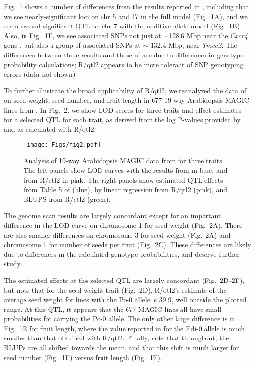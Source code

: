 \documentclass[12pt,letterpaper]{article}
\begin{document}
Fig.~1 shows a number of differences from the results reported in
\citet{gatti2014}, including that we see nearly-significant loci on
chr 5 and 17 in the full model (Fig.~1A), and we see a second
significant QTL on chr 7 with the additive allele model (Fig.~1B).
Also, in Fig.~1E,  we see associated
SNPs not just at $\sim$128.6 Mbp near the \emph{Cxcr4\/} gene
\citep[as in][]{gatti2014}, but also a
group of associated SNPs at $\sim$ 132.4 Mbp, near \emph{Tmcc2}. The
differences between these results and those of \citet{gatti2014} are
due to differences in genotype probability calculations;
R/qtl2 appears to be more tolerant of SNP genotyping errors
(data not shown).

To further illustrate the broad applicability of R/qtl2, we reanalyzed
the data of \citet{gnan2014} on seed weight, seed number, and fruit
length in 677 19-way Arabidopsis MAGIC lines from \citet{kover2009}. In
Fig.~2, we show LOD scores for three traits and effect estimates for a
selected QTL for each trait, as derived from the log P-values provided by
\citet{gnan2014} and as calculated with R/qtl2.


\begin{figure}
  \texttt{[image: Figs/fig2.pdf]}
  \caption{Analysis of 19-way Arabidopsis MAGIC data from
    \citet{gnan2014} for three traits. The left panels show LOD curves
    with the results from \citet{gnan2014} in blue, and from R/qtl2 in
    pink. The right panels show estimated QTL effects from Table 5 of
    \citet{gnan2014} (blue), by linear regression from R/qtl2 (pink),
    and BLUPS from R/qtl2 (green).}
\end{figure}


The genome scan results are largely concordant except for an important
difference in the LOD curve on chromosome 1 for seed weight (Fig.~2A). There are
also smaller differences on chromosome 3 for seed weight (Fig.~2A) and
chromosome 1 for number of seeds per fruit (Fig.~2C). These differences are
likely due to differences in the calculated genotype probabilities,
and deserve further study.

The estimated effects at the selected QTL are largely concordant
(Fig.~2D--2F), but note that for the seed weight trait (Fig.~2D),
R/qtl2's estimate of the average seed weight for lines with the Po-0
allele is 39.9, well outside the plotted range. At this QTL, it
appears that the 677 MAGIC lines all have small probabilities for
carrying the Po-0 allele. The only other large difference is in
Fig.~1E for fruit length, where the value reported in \citet{gnan2014}
for the Edi-0 allele is much smaller than that obtained with R/qtl2.
Finally, note that throughout, the BLUPs are all shifted towards the
mean, and that this shift is much larger for seed number (Fig.~1F)
versus fruit length (Fig.~1E).
\end{document}
